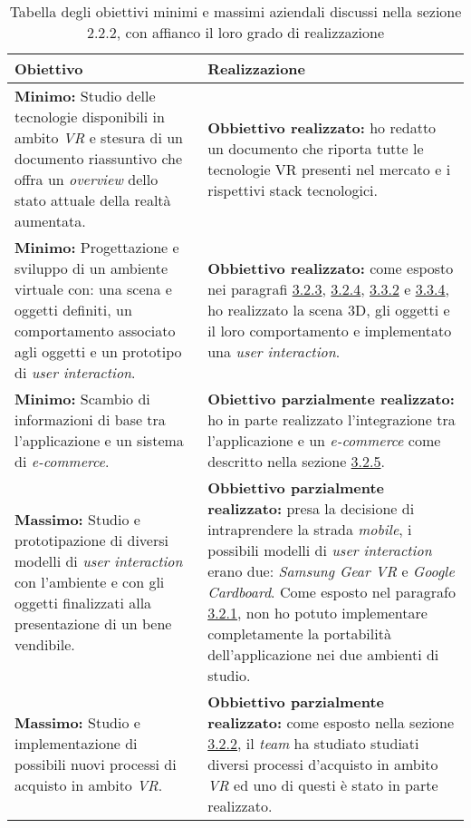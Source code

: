 \begin{table}
	\centering
	\label{tabella-obiettivi}
	\begin{tabular}{| p{6cm} | p{6cm} |}
		\hline
		\textbf{Obiettivo} & \textbf{Realizzazione} \\ \hline
		 \textbf{Minimo:} Studio delle tecnologie disponibili in ambito \textit{VR}\ped{\hyperlink{vr}{G}} e stesura di un documento riassuntivo che offra un \textit{overview} dello stato attuale della realtà aumentata. &  \textbf{Obbiettivo realizzato:} ho redatto un documento che riporta tutte le tecnologie VR presenti nel mercato e i rispettivi stack tecnologici.\\ \hline
		 \textbf{Minimo:} Progettazione e sviluppo di un ambiente virtuale con: una scena e oggetti definiti, un comportamento associato agli oggetti e un prototipo di \textit{user interaction}. & \textbf{Obbiettivo realizzato:} come esposto nei paragrafi \hyperlink{3.2.3}{3.2.3}, \hyperlink{3.2.4}{3.2.4}, \hyperlink{3.3.2}{3.3.2} e \hyperlink{3.3.4}{3.3.4}, ho realizzato la scena 3D, gli oggetti e il loro comportamento e implementato una \textit{user interaction}. \\ \hline
		 \textbf{Minimo:} Scambio di informazioni di base tra l'applicazione e un sistema di \textit{e-commerce}. & \textbf{Obiettivo parzialmente realizzato:} ho in parte realizzato l'integrazione tra l'applicazione e un \textit{e-commerce} come descritto nella sezione \hyperlink{3.2.5}{3.2.5}.\\ \hline
		 \textbf{Massimo:} Studio e prototipazione di diversi modelli di \textit{user interaction} con l'ambiente e con gli oggetti finalizzati alla presentazione di un bene vendibile. & \textbf{Obbiettivo parzialmente realizzato:} presa la decisione di intraprendere la strada \textit{mobile}, i possibili modelli di \textit{user interaction} erano due: \textit{Samsung Gear VR} e \textit{Google Cardboard}. Come esposto nel paragrafo \hyperlink{3.2.1}{3.2.1}, non ho potuto implementare completamente la portabilità dell'applicazione nei due ambienti di studio.\\ \hline
		 \textbf{Massimo:} Studio e implementazione di possibili nuovi processi di acquisto in ambito \textit{VR}\ped{\hyperlink{vr}{G}}. & \textbf{Obbiettivo parzialmente realizzato:} come esposto nella sezione \hyperlink{3.2.2}{3.2.2}, il \textit{team} ha studiato studiati diversi processi d'acquisto in ambito \textit{VR}\ped{\hyperlink{vr}{G}} ed uno di questi è stato in parte realizzato.\\ \hline
	\end{tabular}
	\caption{Tabella degli obiettivi minimi e massimi aziendali discussi nella sezione 2.2.2, con affianco il loro grado di realizzazione}
\end{table}
\FloatBarrier

